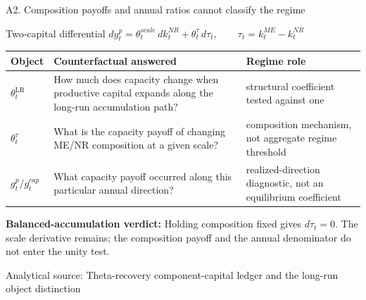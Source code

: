 \documentclass[10pt,aspectratio=169]{beamer}
\newcommand{\LR}{\mathrm{LR}}
\newcommand{\sourcefooter}[1]{%
  \par\vfill{\tiny\color{gray!70}Analytical source: #1}\vspace{-0.35em}}
\begin{document}
\begin{frame}{A2. Composition payoffs and annual ratios cannot classify the regime}
  \begin{block}{Two-capital differential}
    \centering
    \Large
    $\displaystyle
    d y_t^p
    =\theta_t^{scale}\,d k_t^{NR}
    +\theta_t^{\tau}\,d\tau_t,
    \qquad
    \tau_t=k_t^{ME}-k_t^{NR}$
  \end{block}
  \footnotesize
  \renewcommand{\arraystretch}{1.20}
  \begin{tabular}{@{}L{0.25\textwidth}L{0.35\textwidth}L{0.32\textwidth}@{}}
    \toprule
    \textbf{Object} & \textbf{Counterfactual answered} & \textbf{Regime role} \\
    \midrule
    $\theta_t^{\LR}$ & How much does capacity change when productive capital expands along the long-run accumulation path? & structural coefficient tested against one \\
    $\theta_t^{\tau}$ & What is the capacity payoff of changing ME/NR composition at a given scale? & composition mechanism, not aggregate regime threshold \\
    $g_t^p/g_t^{cap}$ & What capacity payoff occurred along this particular annual direction? & realized-direction diagnostic, not an equilibrium coefficient \\
    \bottomrule
  \end{tabular}
  \vspace{0.4em}
  \textbf{Balanced-accumulation verdict:} Holding composition fixed gives $d\tau_t=0$. The scale derivative remains; the composition payoff and the annual denominator do not enter the unity test.
  \sourcefooter{Theta-recovery component-capital ledger and the long-run object distinction}
\end{frame}
\end{document}
